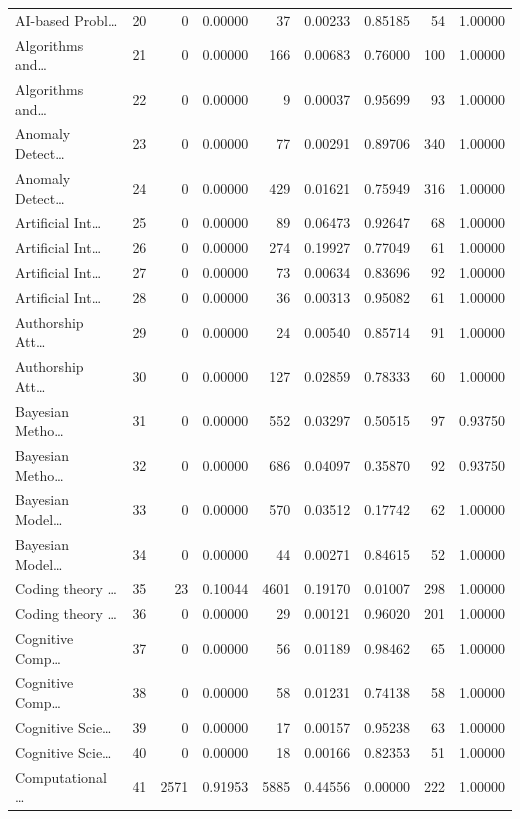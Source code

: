 \begin{table}
\begin{tabular}{lrrrrrrrr}
AI-based Probl… & 20 & 0 & 0.00000 & 37 & 0.00233 & 0.85185 & 54 & 1.00000 \\
Algorithms and… & 21 & 0 & 0.00000 & 166 & 0.00683 & 0.76000 & 100 & 1.00000 \\
Algorithms and… & 22 & 0 & 0.00000 & 9 & 0.00037 & 0.95699 & 93 & 1.00000 \\
Anomaly Detect… & 23 & 0 & 0.00000 & 77 & 0.00291 & 0.89706 & 340 & 1.00000 \\
Anomaly Detect… & 24 & 0 & 0.00000 & 429 & 0.01621 & 0.75949 & 316 & 1.00000 \\
Artificial Int… & 25 & 0 & 0.00000 & 89 & 0.06473 & 0.92647 & 68 & 1.00000 \\
Artificial Int… & 26 & 0 & 0.00000 & 274 & 0.19927 & 0.77049 & 61 & 1.00000 \\
Artificial Int… & 27 & 0 & 0.00000 & 73 & 0.00634 & 0.83696 & 92 & 1.00000 \\
Artificial Int… & 28 & 0 & 0.00000 & 36 & 0.00313 & 0.95082 & 61 & 1.00000 \\
Authorship Att… & 29 & 0 & 0.00000 & 24 & 0.00540 & 0.85714 & 91 & 1.00000 \\
Authorship Att… & 30 & 0 & 0.00000 & 127 & 0.02859 & 0.78333 & 60 & 1.00000 \\
Bayesian Metho… & 31 & 0 & 0.00000 & 552 & 0.03297 & 0.50515 & 97 & 0.93750 \\
Bayesian Metho… & 32 & 0 & 0.00000 & 686 & 0.04097 & 0.35870 & 92 & 0.93750 \\
Bayesian Model… & 33 & 0 & 0.00000 & 570 & 0.03512 & 0.17742 & 62 & 1.00000 \\
Bayesian Model… & 34 & 0 & 0.00000 & 44 & 0.00271 & 0.84615 & 52 & 1.00000 \\
Coding theory … & 35 & 23 & 0.10044 & 4601 & 0.19170 & 0.01007 & 298 & 1.00000 \\
Coding theory … & 36 & 0 & 0.00000 & 29 & 0.00121 & 0.96020 & 201 & 1.00000 \\
Cognitive Comp… & 37 & 0 & 0.00000 & 56 & 0.01189 & 0.98462 & 65 & 1.00000 \\
Cognitive Comp… & 38 & 0 & 0.00000 & 58 & 0.01231 & 0.74138 & 58 & 1.00000 \\
Cognitive Scie… & 39 & 0 & 0.00000 & 17 & 0.00157 & 0.95238 & 63 & 1.00000 \\
Cognitive Scie… & 40 & 0 & 0.00000 & 18 & 0.00166 & 0.82353 & 51 & 1.00000 \\
Computational … & 41 & 2571 & 0.91953 & 5885 & 0.44556 & 0.00000 & 222 & 1.00000 \\

\end{tabular}
\end{table}
